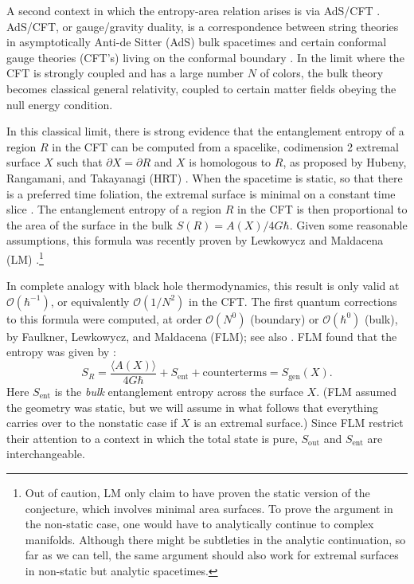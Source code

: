 \documentclass[12pt]{article}
\theoremstyle{remark}
\numberwithin{equation}{section}
\numberwithin{equation}{section}
\begin{document}
A second context in which the entropy-area relation arises is via  AdS/CFT . AdS/CFT, or gauge/gravity duality, is a correspondence between string theories in asymptotically Anti-de Sitter (AdS) bulk spacetimes and certain conformal gauge theories (CFT's) living on the conformal boundary \cite{Maldacena97}.  In the limit where the CFT is strongly coupled and has a large number $N$ of colors, the bulk theory becomes classical general relativity, coupled to certain matter fields obeying the null energy condition.

In this classical limit, there is strong evidence that the entanglement entropy of a region $R$ in the CFT can be computed from a spacelike, codimension 2 extremal surface $X$ such that $\partial X =\partial R$ and $X$ is homologous to $R$, as proposed by Hubeny, Rangamani, and Takayanagi (HRT) \cite{HRT}.   When the spacetime is static, so that there is a preferred time foliation, the extremal surface is minimal on a constant time slice \cite{RT}. The entanglement entropy of a region $R$ in the CFT is then proportional to the area of the surface in the bulk $S(R) = A(X)/4 G\hbar$.  Given some reasonable assumptions, this formula was recently proven by Lewkowycz and Maldacena (LM) \cite{LewkowyczMaldacena}.\footnote{Out of caution, LM only claim to have proven the static version of the conjecture, which involves minimal area surfaces.  To prove the argument in the non-static case, one would have to analytically continue to complex manifolds.  Although there might be subtleties in the analytic continuation, so far as we can tell, the same argument should also work for extremal surfaces in non-static but analytic spacetimes.}

In complete analogy with black hole thermodynamics, this result is only valid at $\mathcal{O}(\hbar^{-1})$, or equivalently $\mathcal{O}(1/N^{2})$ in the CFT. The first quantum corrections to this formula were computed, at order $\mathcal{O}(N^{0})$ (boundary) or $\mathcal{O}(\hbar^{0})$ (bulk), by Faulkner, Lewkowycz, and Maldacena (FLM); see also \cite{SwingleVanRaamsdonk, Barrella:2013wja}. FLM found that the entropy was given by \cite{FaulknerLewkowyczMaldacena}:
\begin{equation}\label{introFLM}
S_{R} = \frac{\langle A (X) \rangle}{4G\hbar} + S_\mathrm{ent} + \mathrm{counterterms} = S_\mathrm{gen}(X).
\end{equation}
Here $S_\mathrm{ent}$ is the \emph{bulk} entanglement entropy across the surface $X$.  (FLM assumed the geometry was static, but we will assume in what follows that everything carries over to the nonstatic case if $X$ is an extremal surface.) Since FLM restrict their attention to a context in which the total state is pure, $S_\mathrm{out}$ and $S_\mathrm{ent}$ are interchangeable.
\end{document}
